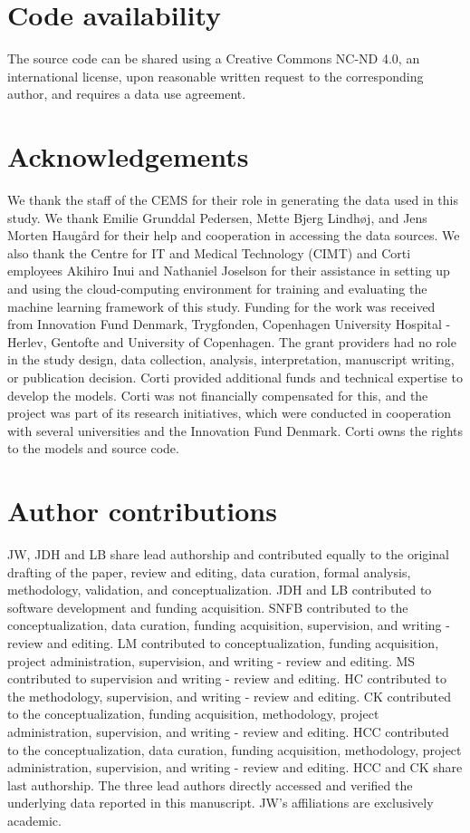 {\section*{Code availability}

The source code can be shared using a Creative Commons NC-ND 4.0, an international license, upon reasonable written request to the corresponding author, and requires a data use agreement. 


\section*{Acknowledgements}

We thank the staff of the CEMS for their role in generating the data used in this study. We thank Emilie Grunddal Pedersen, Mette Bjerg Lindhøj, and Jens Morten Haugård for their help and cooperation in accessing the data sources. We also thank the Centre for IT and Medical Technology (CIMT) and Corti employees Akihiro Inui and Nathaniel Joselson for their assistance in setting up and using the cloud-computing environment for training and evaluating the machine learning framework of this study. Funding for the work was received from Innovation Fund Denmark, Trygfonden, Copenhagen University Hospital - Herlev, Gentofte and University of Copenhagen. The grant providers had no role in the study design, data collection, analysis, interpretation, manuscript writing, or publication decision. Corti provided additional funds and technical expertise to develop the models. Corti was not financially compensated for this, and the project was part of its research initiatives, which were conducted in cooperation with several universities and the Innovation Fund Denmark. Corti owns the rights to the models and source code.


\section*{Author contributions}

JW, JDH and LB share lead authorship and contributed equally to the original drafting of the paper, review and editing, data curation, formal analysis, methodology, validation, and conceptualization. JDH and LB contributed to software development and funding acquisition. SNFB contributed to the conceptualization, data curation, funding acquisition, supervision, and writing - review and editing. LM contributed to conceptualization, funding acquisition, project administration, supervision, and writing - review and editing. MS contributed to supervision and writing - review and editing. HC contributed to the methodology, supervision, and writing - review and editing. CK contributed to the conceptualization, funding acquisition, methodology, project administration, supervision, and writing - review and editing. HCC contributed to the conceptualization, data curation, funding acquisition, methodology, project administration, supervision, and writing - review and editing. HCC and CK share last authorship. The three lead authors directly accessed and verified the underlying data reported in this manuscript. JW's affiliations are exclusively academic.


}
